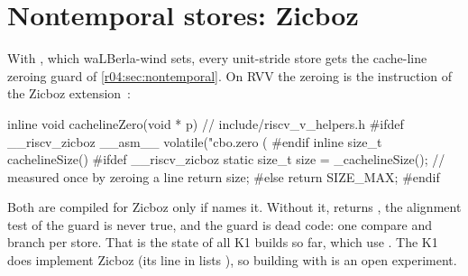 \section{Nontemporal stores: Zicboz}\label{r04:sec:rvv-zicboz}

With , which waLBerla-wind sets, every unit-stride store gets the
cache-line zeroing guard of \cref{r04:sec:nontemporal}. On RVV the zeroing is the
instruction  of the Zicboz extension~\cite{riscv-cmo}:
\begin{ccode}
inline void cachelineZero(void * p) {        // include/riscv_v_helpers.h
#ifdef __riscv_zicboz
	__asm__ volatile("cbo.zero (%
#endif
}
inline size_t cachelineSize() {
#ifdef __riscv_zicboz
	static size_t size = _cachelineSize();   // measured once by zeroing a line
	return size;
#else
	return SIZE_MAX;
#endif
}
\end{ccode}
Both are compiled for Zicboz only if  names it. Without it,
 returns , the alignment test of the guard is never
true, and the guard is dead code: one compare and branch per store. That is the state
of all K1 builds so far, which use . The K1 does implement
Zicboz (its  line in  lists ), so building
with  is an open experiment.
